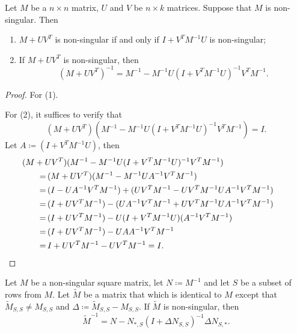 \begin{theorem}
\label{thm:smw-formula}
    Let \(M\) be a \(n \times n\) matrix, \(U\) and \(V\) be \(n \times k\) matrices.
    Suppose that \(M\) is non-singular. 
    Then
    \begin{enumerate}[label = (\arabic*)]
        \item \(M + UV^T\) is non-singular if and only if \(I + V^TM^{-1}U\) is non-singular;
        \item If \(M + UV^T\) is non-singular, then
        \[
            (M + UV^T)^{-1} = M^{-1} - M^{-1}U(I + V^TM^{-1}U)^{-1}V^TM^{-1}.
        \]
    \end{enumerate}
\end{theorem}

\begin{proof}
    For (1).

    For (2), it suffices to verify that 
    \[
        (M + UV^T)(M^{-1} - M^{-1}U(I + V^TM^{-1}U)^{-1}V^TM^{-1}) = I.
    \]
    Let \(A \coloneqq (I + V^TM^{-1}U)\), then
    \begin{align*}
        &\!\!\!\!\!\!\!\!\!\!\!\!\!\!\!\!\!\! (M + UV^T)(M^{-1} - M^{-1}U(I + V^TM^{-1}U)^{-1}V^TM^{-1})\\
        = \, &(M + UV^T)(M^{-1} - M^{-1}UA^{-1}V^TM^{-1})\\
        = \, &(I - UA^{-1}V^TM^{-1}) + (UV^TM^{-1} - UV^TM^{-1}UA^{-1}V^TM^{-1}) \\
        = \, &(I + UV^TM^{-1}) - (UA^{-1}V^TM^{-1} + UV^TM^{-1}UA^{-1}V^TM^{-1}) \\
        = \, &(I + UV^TM^{-1}) - U(I + V^TM^{-1}U)(A^{-1}V^TM^{-1}) \\
        = \, &(I + UV^TM^{-1}) - UAA^{-1}V^TM^{-1} \\
        = \, &I + UV^TM^{-1} - UV^TM^{-1} = I. \qedhere \\
    \end{align*}
\end{proof}

\begin{corollary}
    \label{cor:update_cor} 
    Let \(M\) be a non-singular square matrix, let \(N \coloneqq M^{-1}\) and let \(S\) be a subset of rows from \(M\).
    Let \(\tilde{M}\) be a matrix that which is identical to \(M\) except that \(\tilde{M}_{S, S} \neq M_{S, S}\)
    and \(\Delta \coloneqq \tilde{M}_{S, S} - M_{S, S}\).
    If \(\tilde{M}\) is non-singular, then
    \[
        \tilde{M}^{-1} = N - N_{*, S}(I + \Delta N_{S, S})^{-1}\Delta N_{S, *}.
    \]
\end{corollary}

